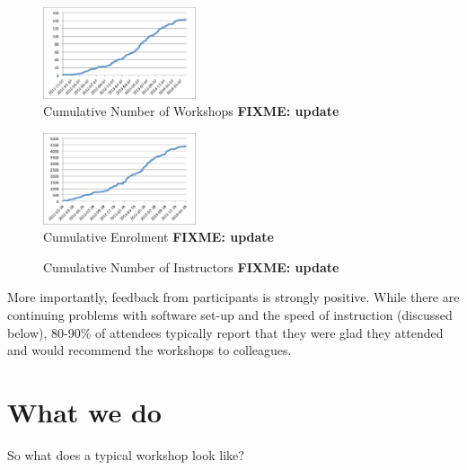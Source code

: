 \documentclass[10pt,a4paper,twocolumn]{article}
\newcommand{\fixme}[1]{\bf{FIXME: {#1}}}
\begin{document}
\begin{figure}
\centering
\includegraphics[width=0.4\textwidth]{workshops.pdf}
\caption{\label{f:workshops}Cumulative Number of Workshops \fixme{update}}
\end{figure}

\begin{figure}
\centering
\includegraphics[width=0.4\textwidth]{enrolment.pdf}
\caption{\label{f:enrolment}Cumulative Enrolment \fixme{update}}
\end{figure}

\begin{figure}
\centering
\caption{\label{f:instructors}Cumulative Number of Instructors \fixme{update}}
\end{figure}

More importantly, feedback from participants is strongly
positive. While there are continuing problems with software set-up and
the speed of instruction (discussed below), 80-90\% of attendees
typically report that they were glad they attended and would recommend
the workshops to colleagues.

\section*{What we do}

So what does a typical workshop look like?
\end{document}
